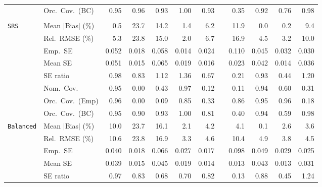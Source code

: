 \begin{landscape}
\begin{longtable}{llrrrrrrrrrr}
 & Orc.\ Cov.\ (BC) & \cellcolor{rankone}0.95 & \cellcolor{ranktwo}0.96 & \cellcolor{rankthree}0.93 & 1.00 & \cellcolor{rankthree}0.93 &  & 0.35 & 0.92 & 0.76 & 0.98 \\
\addlinespace[2pt]
\multicolumn{12}{l}{\textbf{Continuous Phase-One Covariates}} \\
\addlinespace[2pt]
\quad \texttt{SRS} & Mean $|$Bias$|$ (\%) & \cellcolor{rankthree}0.5 & 23.7 & 14.2 & 1.4 & 6.2 &  & 11.9 & \cellcolor{rankone}0.0 & \cellcolor{ranktwo}0.2 & 9.4 \\
 & Rel.\ RMSE (\%) & 5.3 & 23.8 & 15.0 & \cellcolor{rankone}2.0 & 6.7 &  & 16.9 & \cellcolor{rankthree}4.5 & \cellcolor{ranktwo}3.2 & 10.0 \\
 & Emp.\ SE & 0.052 & 0.018 & 0.058 & 0.014 & 0.024 &  & 0.110 & 0.045 & 0.032 & 0.030 \\
 & Mean SE & 0.051 & 0.015 & 0.065 & 0.019 & 0.016 &  & 0.023 & 0.042 & 0.014 & 0.036 \\
 & SE ratio & \cellcolor{rankone}0.98 & 0.83 & \cellcolor{rankthree}1.12 & 1.36 & 0.67 &  & 0.21 & \cellcolor{ranktwo}0.93 & 0.44 & 1.20 \\
 & Nom.\ Cov. & \cellcolor{rankone}0.95 & 0.00 & 0.43 & \cellcolor{rankthree}0.97 & 0.12 &  & 0.11 & \cellcolor{ranktwo}0.94 & 0.60 & 0.31 \\
 & Orc.\ Cov.\ (Emp) & \cellcolor{ranktwo}0.96 & 0.00 & 0.09 & 0.85 & 0.33 &  & \cellcolor{rankthree}0.86 & \cellcolor{rankone}0.95 & \cellcolor{ranktwo}0.96 & 0.18 \\
 & Orc.\ Cov.\ (BC) & \cellcolor{rankone}0.95 & 0.90 & \cellcolor{rankthree}0.93 & 1.00 & 0.81 &  & 0.40 & \cellcolor{ranktwo}0.94 & 0.59 & 0.98 \\
\addlinespace[2pt]
\quad \texttt{Balanced} & Mean $|$Bias$|$ (\%) & 10.0 & 23.7 & 16.1 & \cellcolor{ranktwo}2.1 & 4.2 &  & 4.1 & \cellcolor{rankone}0.1 & \cellcolor{rankthree}2.6 & 3.6 \\
 & Rel.\ RMSE (\%) & 10.6 & 23.8 & 16.9 & \cellcolor{rankone}3.3 & 4.6 &  & 10.4 & 4.9 & \cellcolor{ranktwo}3.8 & \cellcolor{rankthree}4.5 \\
 & Emp.\ SE & 0.040 & 0.018 & 0.066 & 0.027 & 0.017 &  & 0.098 & 0.049 & 0.029 & 0.025 \\
 & Mean SE & 0.039 & 0.015 & 0.045 & 0.019 & 0.014 &  & 0.013 & 0.043 & 0.013 & 0.031 \\
 & SE ratio & \cellcolor{rankone}0.97 & \cellcolor{rankthree}0.83 & 0.68 & 0.70 & 0.82 &  & 0.13 & \cellcolor{ranktwo}0.88 & 0.45 & 1.24 \\

\end{longtable}
\end{landscape}
